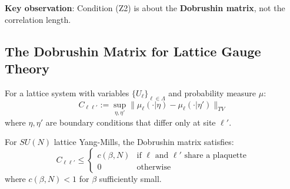 \textbf{Key observation}: Condition (Z2) is about the \textbf{Dobrushin matrix}, 
not the correlation length.

\subsection{The Dobrushin Matrix for Lattice Gauge Theory}

\begin{definition}
For a lattice system with variables $\{U_\ell\}_{\ell \in \Lambda}$ and 
probability measure $\mu$:
\[
C_{\ell\ell'} := \sup_{\eta, \eta'} \|\mu_\ell(\cdot | \eta) - \mu_\ell(\cdot | \eta')\|_{TV}
\]
where $\eta, \eta'$ are boundary conditions that differ only at site $\ell'$.
\end{definition}

\begin{lemma}
\label{lem:dobrushin-ym}
For $SU(N)$ lattice Yang-Mills, the Dobrushin matrix satisfies:
\[
C_{\ell\ell'} \leq \begin{cases}
c(\beta, N) & \text{if } \ell \text{ and } \ell' \text{ share a plaquette} \\
0 & \text{otherwise}
\end{cases}
\]
where $c(\beta, N) < 1$ for $\beta$ sufficiently small.
\end{lemma}

